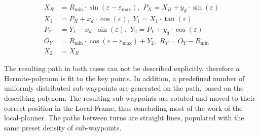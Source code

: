 \documentclass{ifacconf}
\begin{document}
\begin{align}
X_R &= R_\text{min} \cdot \sin(\varepsilon - \varepsilon _\text{max}),\,\, P_X = X_R + y_d \cdot \sin(\varepsilon)\\
X_1 &= P_X + x_d \cdot \cos(\varepsilon),\,\, Y_1 = X_1 \cdot \tan(\varepsilon)\\
P_Y &= Y_1 - x_d \cdot \sin(\varepsilon),\,\, Y_2 = P_Y + y_d \cdot \cos(\varepsilon)\\
O_Y &= R_\text{min} \cdot \cos(\varepsilon - \varepsilon _\text{max}) + Y_2,\,\, R_Y = O_Y - R_\text{min}\\
X_2 &= X_R
\end{align}

The resulting path in both cases can not be described explicitly, therefore a Hermite-polynom is fit to the key points. In addition, a predefined number of uniformly distributed sub-waypoints are generated on the path, based on the describing polynom. The resulting sub-waypoints are rotated and moved to their correct position in the Local-Frame, thus concluding most of the work of the local-planner. The paths between turns are straight lines, populated with the same preset density of sub-waypoints.
\end{document}
